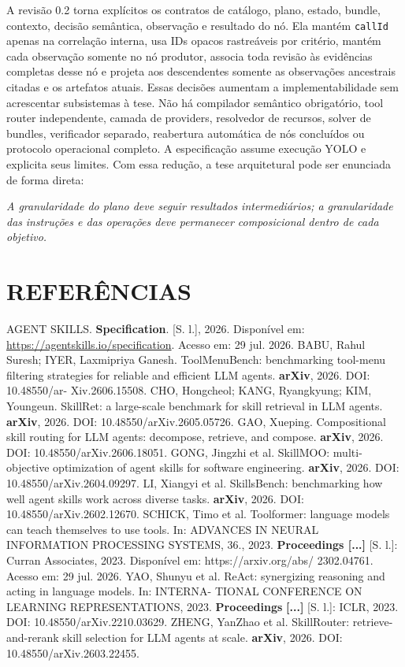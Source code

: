 \documentclass[12pt,a4paper]{article}
\begin{document}
A revisão 0.2 torna explícitos os contratos de catálogo, plano, estado, bundle, contexto, decisão semântica, observação e resultado do nó. Ela mantém \texttt{callId} apenas na correlação interna, usa IDs opacos rastreáveis por critério, mantém cada observação somente no nó produtor, associa toda revisão às evidências completas desse nó e projeta aos descendentes somente as observações ancestrais citadas e os artefatos atuais. Essas decisões aumentam a implementabilidade sem acrescentar subsistemas à tese. Não há compilador semântico obrigatório, tool router independente, camada de providers, resolvedor de recursos, solver de bundles, verificador separado, reabertura automática de nós concluídos ou protocolo operacional completo. A especificação assume execução YOLO e explicita seus limites. Com essa redução, a tese arquitetural pode ser enunciada de forma direta:



\textit{A granularidade do plano deve seguir resultados intermediários; a granularidade das} \textit{instruções e das operações deve permanecer composicional dentro de cada objetivo.}


\section*{REFERÊNCIAS}

AGENT SKILLS.\textbf{ Specification}. [S. l.], 2026. Disponível em: \url{https://agentskills.io/specification}. Acesso em: 29 jul. 2026. BABU, Rahul Suresh; IYER, Laxmipriya Ganesh. ToolMenuBench: benchmarking tool-menu filtering strategies for reliable and efficient LLM agents.\textbf{ arXiv}, 2026. DOI: 10.48550/ar- Xiv.2606.15508. CHO, Hongcheol; KANG, Ryangkyung; KIM, Youngeun. SkillRet: a large-scale benchmark for skill retrieval in LLM agents.\textbf{ arXiv}, 2026. DOI: 10.48550/arXiv.2605.05726. GAO, Xueping. Compositional skill routing for LLM agents: decompose, retrieve, and compose. \textbf{arXiv}, 2026. DOI: 10.48550/arXiv.2606.18051. GONG, Jingzhi et al. SkillMOO: multi-objective optimization of agent skills for software engineering.\textbf{ arXiv}, 2026. DOI: 10.48550/arXiv.2604.09297. LI, Xiangyi et al. SkillsBench: benchmarking how well agent skills work across diverse tasks. \textbf{arXiv}, 2026. DOI: 10.48550/arXiv.2602.12670. SCHICK, Timo et al. Toolformer: language models can teach themselves to use tools. In: ADVANCES IN NEURAL INFORMATION PROCESSING SYSTEMS, 36., 2023. \textbf{Proceedings [...]} [S. l.]: Curran Associates, 2023. Disponível em: https://arxiv.org/abs/ 2302.04761. Acesso em: 29 jul. 2026. YAO, Shunyu et al. ReAct: synergizing reasoning and acting in language models. In: INTERNA- TIONAL CONFERENCE ON LEARNING REPRESENTATIONS, 2023.\textbf{ Proceedings} \textbf{[...]} [S. l.]: ICLR, 2023. DOI: 10.48550/arXiv.2210.03629. ZHENG, YanZhao et al. SkillRouter: retrieve-and-rerank skill selection for LLM agents at scale. \textbf{arXiv}, 2026. DOI: 10.48550/arXiv.2603.22455.
\end{document}
